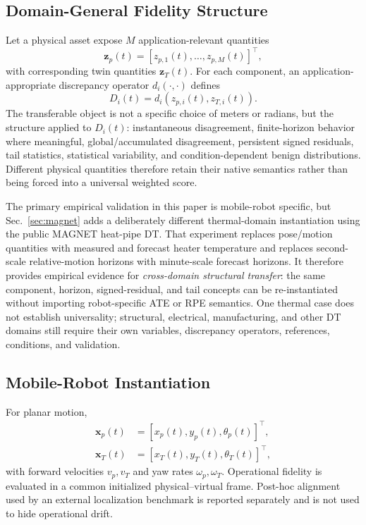 \documentclass[journal]{IEEEtran}
\begin{document}
\subsection{Domain-General Fidelity Structure}
Let a physical asset expose $M$ application-relevant quantities
\begin{equation}
\mathbf{z}_p(t)=[z_{p,1}(t),\ldots,z_{p,M}(t)]^{\top},
\end{equation}
with corresponding twin quantities $\mathbf{z}_T(t)$. For each component, an application-appropriate discrepancy operator $d_i(\cdot,\cdot)$ defines
\begin{equation}
D_i(t)=d_i\!\left(z_{p,i}(t),z_{T,i}(t)\right).
\end{equation}
The transferable object is not a specific choice of meters or radians, but the structure applied to $D_i(t)$: instantaneous disagreement, finite-horizon behavior where meaningful, global/accumulated disagreement, persistent signed residuals, tail statistics, statistical variability, and condition-dependent benign distributions. Different physical quantities therefore retain their native semantics rather than being forced into a universal weighted score.

The primary empirical validation in this paper is mobile-robot specific, but Sec.~\ref{sec:magnet} adds a deliberately different thermal-domain instantiation using the public MAGNET heat-pipe DT. That experiment replaces pose/motion quantities with measured and forecast heater temperature and replaces second-scale relative-motion horizons with minute-scale forecast horizons. It therefore provides empirical evidence for \emph{cross-domain structural transfer}: the same component, horizon, signed-residual, and tail concepts can be re-instantiated without importing robot-specific ATE or RPE semantics. One thermal case does not establish universality; structural, electrical, manufacturing, and other DT domains still require their own variables, discrepancy operators, references, conditions, and validation.

\subsection{Mobile-Robot Instantiation}
For planar motion,
\begin{align}
\mathbf{x}_p(t)&=[x_p(t),y_p(t),\theta_p(t)]^{\top},\\
\mathbf{x}_T(t)&=[x_T(t),y_T(t),\theta_T(t)]^{\top},
\end{align}
with forward velocities $v_p,v_T$ and yaw rates $\omega_p,\omega_T$. Operational fidelity is evaluated in a common initialized physical--virtual frame. Post-hoc alignment used by an external localization benchmark is reported separately and is not used to hide operational drift.
\end{document}
